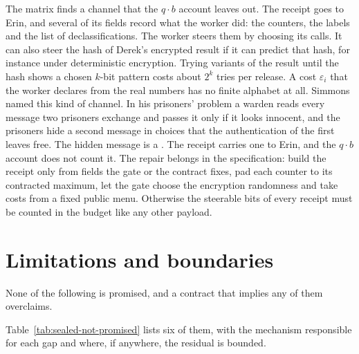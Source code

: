 \documentclass[11pt,a4paper]{article}
\theoremstyle{definition}
\begin{document}
The matrix finds a channel that the $q\cdot b$ account leaves out. The
receipt goes to Erin, and several of its fields record what the worker did:
the counters, the labels and the list of declassifications. The worker steers
them by choosing its calls. It can also steer the hash of Derek's encrypted
result if it can predict that hash, for instance under deterministic
encryption. Trying variants of the result until the hash shows a chosen
$k$-bit pattern costs about $2^k$ tries per release. A cost $\varepsilon_i$
that the worker declares from the real numbers has no finite alphabet at all.
Simmons named this kind of channel. In his prisoners' problem a warden reads
every message two prisoners exchange and passes it only if it looks
innocent, and the prisoners hide a second message in choices that the
authentication of the first leaves free. The hidden message is a
 . The receipt carries one to
Erin, and the $q\cdot b$ account does not count it. The repair belongs in the
specification: build the receipt only from fields the gate or the contract
fixes, pad each counter to its contracted maximum, let the gate choose the
encryption randomness and take costs from a fixed public menu. Otherwise the
steerable bits of every receipt must be counted in the budget like any other
payload.

\pdexercisepointerone{\ref{ex:sealed-budget}}{\pageref{ex:sealed-budget}}



\section{Limitations and boundaries}\label{sec:sealed-limitations}

None of the following is promised, and a contract that implies any of them
overclaims.

Table~\ref{tab:sealed-not-promised} lists six of them, with the mechanism
responsible for each gap and where, if anywhere, the residual is bounded.
\end{document}
